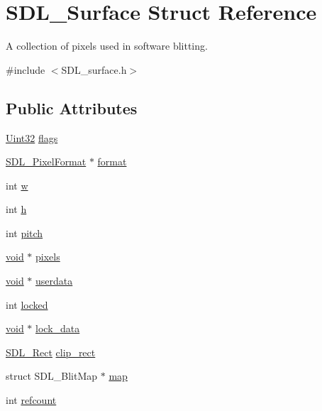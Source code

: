 \hypertarget{struct_s_d_l___surface}{}\section{S\+D\+L\+\_\+\+Surface Struct Reference}
\label{struct_s_d_l___surface}


A collection of pixels used in software blitting.  




{\ttfamily \#include $<$S\+D\+L\+\_\+surface.\+h$>$}

\subsection*{Public Attributes}
\begin{DoxyCompactItemize}
\item 
\hyperlink{_s_d_l__stdinc_8h_add440eff171ea5f55cb00c4a9ab8672d}{Uint32} \hyperlink{struct_s_d_l___surface_a86d78b665d5dfd7aa1dd9696b067641b}{flags}
\item 
\hyperlink{struct_s_d_l___pixel_format}{S\+D\+L\+\_\+\+Pixel\+Format} $\ast$ \hyperlink{struct_s_d_l___surface_a0a90721f947c10c3b79e02ccb419ca62}{format}
\item 
int \hyperlink{struct_s_d_l___surface_a9b0ec7185dcdb2a3530a9160a6ea83d9}{w}
\item 
int \hyperlink{struct_s_d_l___surface_af33bcf87a1f5e10a99b3c7e8626b38c8}{h}
\item 
int \hyperlink{struct_s_d_l___surface_a5fa37325d77d65b2ed64ffc7cd01bb6c}{pitch}
\item 
\hyperlink{_s_d_l__opengles2__gl2ext_8h_ae5d8fa23ad07c48bb609509eae494c95}{void} $\ast$ \hyperlink{struct_s_d_l___surface_abd9597e0e084b8ef33fe0397bc26d911}{pixels}
\item 
\hyperlink{_s_d_l__opengles2__gl2ext_8h_ae5d8fa23ad07c48bb609509eae494c95}{void} $\ast$ \hyperlink{struct_s_d_l___surface_ae66d973dcb9b57cb34815892e1ee1f31}{userdata}
\item 
int \hyperlink{struct_s_d_l___surface_a5022edaeea1c0a055fa5d6dccba41de2}{locked}
\item 
\hyperlink{_s_d_l__opengles2__gl2ext_8h_ae5d8fa23ad07c48bb609509eae494c95}{void} $\ast$ \hyperlink{struct_s_d_l___surface_a0afacfb933b54a9af0846a307a6924fb}{lock\+\_\+data}
\item 
\hyperlink{struct_s_d_l___rect}{S\+D\+L\+\_\+\+Rect} \hyperlink{struct_s_d_l___surface_aa9a0da3b38261dad6cf0cc4e3bb5b0c3}{clip\+\_\+rect}
\item 
struct S\+D\+L\+\_\+\+Blit\+Map $\ast$ \hyperlink{struct_s_d_l___surface_a8c1ecad399b0d4f525b1a53b6ee9393f}{map}
\item 
int \hyperlink{struct_s_d_l___surface_a03d10628a359c0674f5ceffd574f1641}{refcount}
\end{DoxyCompactItemize}


